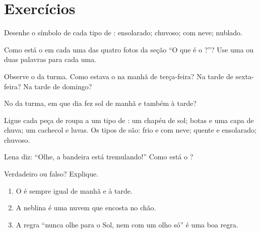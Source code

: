 \section{Exercícios}

\begin{exercise}[$\star$]\label{exo:g1:watching-the-weather:1}
Desenhe o símbolo de cada tipo de : ensolarado; chuvoso; com neve; nublado.
\end{exercise}

\begin{exercise}[$\star$]\label{exo:g1:watching-the-weather:2}
Como está o  em cada uma das quatro fotos da seção ``O que é o
?''? Use uma ou duas palavras para cada uma.
\end{exercise}

\begin{exercise}[$\star$]\label{exo:g1:watching-the-weather:3}
Observe o  da turma. Como estava o  na manhã de
terça-feira? Na tarde de sexta-feira? Na tarde de domingo?
\end{exercise}

\begin{exercise}[$\star$]\label{exo:g1:watching-the-weather:4}
No  da turma, em que dia fez sol de manhã e também à
tarde?
\end{exercise}

\begin{exercise}[$\star$]\label{exo:g1:watching-the-weather:5}
Ligue cada peça de roupa a um tipo de : um chapéu de sol; botas e
uma capa de chuva; um cachecol e luvas. Os tipos de  são: frio e
com neve; quente e ensolarado; chuvoso.
\end{exercise}

\begin{exercise}[$\star$]\label{exo:g1:watching-the-weather:6}
Lena diz: ``Olhe, a bandeira está tremulando!'' Como está o ?
\end{exercise}

\begin{exercise}[$\star$]\label{exo:g1:watching-the-weather:7}
Verdadeiro ou falso? Explique.
\begin{enumerate}
  \item O  é sempre igual de manhã e à tarde.
  \item A neblina é uma nuvem que encosta no chão.
  \item A regra ``nunca olhe para o Sol, nem com um olho só'' é uma boa regra.
\end{enumerate}
\end{exercise}

